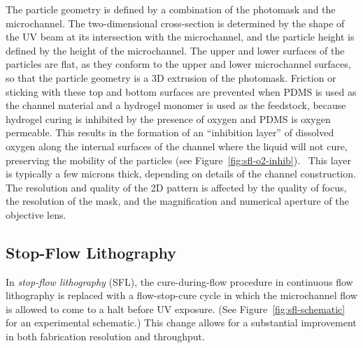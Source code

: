 The particle geometry is defined by a combination of the photomask and the microchannel.  The two-dimensional cross-section
is determined by the shape of the UV beam at its intersection with the microchannel, and the particle height is defined by
the height of the microchannel. The upper and lower surfaces of the particles
are flat, as they conform to the upper and lower microchannel surfaces, so that the particle geometry
is a 3D extrusion of the photomask.
Friction or sticking with these top and bottom
surfaces are prevented when PDMS is used as the channel material and a hydrogel monomer is 
used as the feedstock,
because hydrogel
curing is inhibited by the presence of oxygen and PDMS is oxygen permeable. This results in the formation of an 
``inhibition layer'' of dissolved oxygen
along the internal surfaces of the channel where the liquid will not cure, preserving the mobility 
of the particles (see Figure~\ref{fig:sfl-o2-inhib}).~\cite{dendukuri-oxygen}
This layer is typically a few microns thick, depending on 
details of the channel construction.
The resolution and quality of the 2D pattern 
is affected by the quality of focus, the resolution of the mask,
and the magnification and numerical aperture of the objective lens.  

\subsection{Stop-Flow Lithography}
\label{sec:SFL}


In \textit{stop-flow lithography} (SFL), the cure-during-flow
procedure in continuous flow lithography is replaced with a flow-stop-cure cycle in which the microchannel flow
is allowed to come to a halt before UV exposure. (See Figure~\ref{fig:sfl-schematic} for an experimental
schematic.) This change allows for a substantial improvement in both 
fabrication resolution and throughput.~\cite{dendukuri-sfl}

